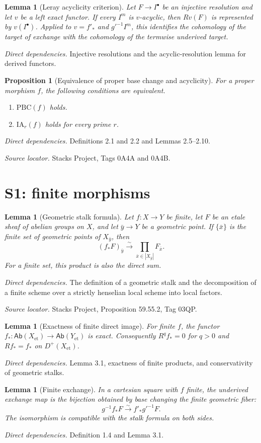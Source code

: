 \documentclass[10pt]{article}
\newtheorem{proposition}[theorem]{Proposition}
\newtheorem{lemma}[theorem]{Lemma}
\theoremstyle{definition}
\newcommand{\Ab}{\mathsf{Ab}}
\newcommand{\Et}{\mathrm{et}}
\newcommand{\deps}[1]{\par\smallskip\textit{Direct dependencies.} #1\par}
\newcommand{\sources}[1]{\par\textit{Source locator.} #1\par}
\begin{document}
\begin{lemma}[Leray acyclicity criterion]
Let $F\to I^\bullet$ be an injective resolution and let $v$ be a left exact
functor.  If every $I^m$ is $v$-acyclic, then $Rv(F)$ is represented by
$v(I^\bullet)$.  Applied to $v=f'_*$ and $g'^{-1}I^m$, this identifies the
cohomology of the target of exchange with the cohomology of the termwise
underived target.
\end{lemma}
\deps{Injective resolutions and the acyclic-resolution lemma for derived
functors.}

\begin{proposition}[Equivalence of proper base change and acyclicity]
For a proper morphism $f$, the following conditions are equivalent.
\begin{enumerate}
\item $\mathrm{PBC}(f)$ holds.
\item $\mathrm{IA}_r(f)$ holds for every prime $r$.
\end{enumerate}
\end{proposition}
\deps{Definitions 2.1 and 2.2 and Lemmas 2.5--2.10.}
\sources{Stacks Project, Tags 0A4A and 0A4B.}

\section{S1: finite morphisms}

\begin{lemma}[Geometric stalk formula]
Let $f:X\to Y$ be finite, let $F$ be an etale sheaf of abelian groups on
$X$, and let $\bar y\to Y$ be a geometric point.  If
$\{\bar x\}$ is the finite set of geometric points of $X_{\bar y}$, then
\[
 (f_*F)_{\bar y}\xrightarrow{\sim}
 \prod_{\bar x\in|X_{\bar y}|}F_{\bar x}.
\]
For a finite set, this product is also the direct sum.
\end{lemma}
\deps{The definition of a geometric stalk and the decomposition of a
finite scheme over a strictly henselian local scheme into local factors.}
\sources{Stacks Project, Proposition 59.55.2, Tag 03QP.}

\begin{lemma}[Exactness of finite direct image]
For finite $f$, the functor
$f_*:\Ab(X_{\Et})\to\Ab(Y_{\Et})$ is exact.  Consequently
$R^qf_*=0$ for $q>0$ and $Rf_*=f_*$ on $D^+(X_{\Et})$.
\end{lemma}
\deps{Lemma 3.1, exactness of finite products, and conservativity of
geometric stalks.}

\begin{lemma}[Finite exchange]
In a cartesian square with $f$ finite, the underived exchange map is the
bijection obtained by base changing the finite geometric fiber:
\[
 g^{-1}f_*F\xrightarrow{\sim}f'_*g'^{-1}F.
\]
The isomorphism is compatible with the stalk formula on both sides.
\end{lemma}
\deps{Definition 1.4 and Lemma 3.1.}
\end{document}
